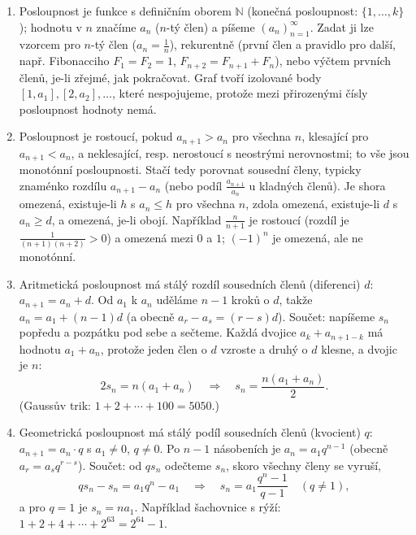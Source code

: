 \begin{enumerate}[label=\textbf{\arabic*.}, leftmargin=*, itemsep=0.8em]
  \item {}
  Posloupnost je funkce s definičním oborem $\mathbb{N}$ (konečná posloupnost: $\{1, \ldots, k\}$); hodnotu v $n$ značíme $a_n$ ($n$-tý člen) a píšeme ${(a_n)}_{n=1}^{\infty}$. Zadat ji lze vzorcem pro $n$-tý člen ($a_n = \frac{1}{n}$), rekurentně (první člen a pravidlo pro další, např. Fibonacciho $F_1 = F_2 = 1$, $F_{n+2} = F_{n+1} + F_n$), nebo výčtem prvních členů, je-li zřejmé, jak pokračovat. Graf tvoří izolované body $[1, a_1], [2, a_2], \ldots$, které nespojujeme, protože mezi přirozenými čísly posloupnost hodnoty nemá. 

  \item {}
  Posloupnost je rostoucí, pokud $a_{n+1} > a_n$ pro všechna $n$, klesající pro $a_{n+1} < a_n$, a neklesající, resp. nerostoucí s neostrými nerovnostmi; to vše jsou monotónní posloupnosti. Stačí tedy porovnat sousední členy, typicky znaménko rozdílu $a_{n+1} - a_n$ (nebo podíl $\frac{a_{n+1}}{a_n}$ u kladných členů). Je shora omezená, existuje-li $h$ s $a_n\leq h$ pro všechna $n$, zdola omezená, existuje-li $d$ s $a_n\geq d$, a omezená, je-li obojí. Například $\frac{n}{n + 1}$ je rostoucí (rozdíl je $\frac{1}{(n + 1)(n + 2)} > 0$) a omezená mezi $0$ a $1$; ${(-1)}^n$ je omezená, ale ne monotónní.

  \item {}
  Aritmetická posloupnost má stálý rozdíl sousedních členů (diferenci) $d$: $a_{n+1} = a_n + d$. Od $a_1$ k $a_n$ uděláme $n - 1$ kroků o $d$, takže $a_n = a_1 + (n - 1)d$ (a obecně $a_r - a_s = (r - s)d$). Součet: napíšeme $s_n$ popředu a pozpátku pod sebe a sečteme. Každá dvojice $a_k + a_{n+1-k}$ má hodnotu $a_1 + a_n$, protože jeden člen o $d$ vzroste a druhý o $d$ klesne, a dvojic je $n$:
  \begin{equation*}
    2s_n = n(a_1 + a_n) \quad\Rightarrow\quad s_n = \frac{n(a_1 + a_n)}{2}.
  \end{equation*}
  (Gaussův trik: $1 + 2 + \cdots + 100 = 5050$.) 

  \item {}
  Geometrická posloupnost má stálý podíl sousedních členů (kvocient) $q$: $a_{n+1} = a_n\cdot q$ s $a_1\neq 0$, $q\neq 0$. Po $n - 1$ násobeních je $a_n = a_1q^{n-1}$ (obecně $a_r = a_sq^{r-s}$). Součet: od $qs_n$ odečteme $s_n$, skoro všechny členy se vyruší,
  \begin{equation*}
    qs_n - s_n = a_1q^n - a_1 \quad\Rightarrow\quad s_n = a_1\frac{q^n - 1}{q - 1}\quad (q\neq 1),
  \end{equation*}
  a pro $q = 1$ je $s_n = na_1$. Například šachovnice s rýží: $1 + 2 + 4 + \cdots + 2^{63} = 2^{64} - 1$. 


\end{enumerate}

